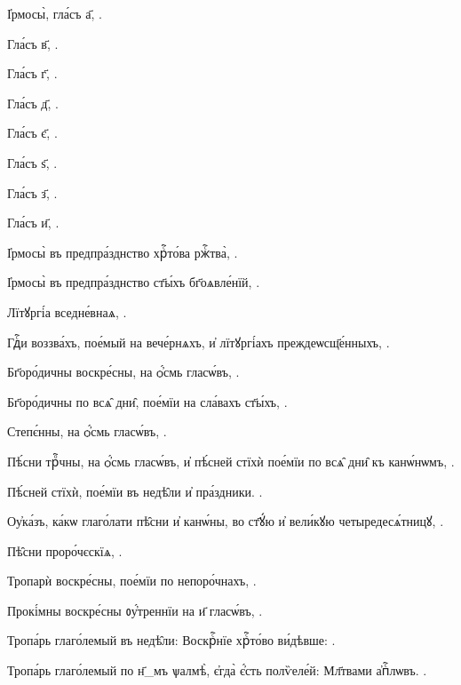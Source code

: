 \cleartorecto

\pagestyle{hirmologion-simplehead}


%
\thispagestyle{hirmologion-simplehead}

І҆рмосы̀, гла́съ а҃, .

Гла́съ в҃, .

Гла́съ г҃, . 

Гла́съ д҃, .

Гла́съ є҃, .

Гла́съ ѕ҃, . 

Гла́съ з҃, .

Гла́съ и҃, .

І҆рмосы̀ въ предпра́зднство хрⷭ҇то́ва ржⷭ҇тва̀, . 

І҆рмосы̀ въ предпра́зднство ст҃ы́хъ бг҃оѧвле́нїй, . 

Лїтꙋргі́а вседне́внаѧ, . 

Гдⷭ҇и воззва́хъ, пое́мый на вече́рнѧхъ, и҆ лїтꙋргі́ахъ  преждеѡсщ҃е́нныхъ, . 

Бг҃оро́дичны воскре́сны, на ѻ҆́смь гласѡ́въ, . 

Бг҃оро́дичны по всѧ̑ дни̑, пое́мїи на сла́вахъ ст҃ы́хъ, . 

Степє́нны, на ѻ҆́смь гласѡ́въ, .

Пѣ́сни трⷪ҇чны, на ѻ҆́смь гласѡ́въ, и҆ пѣ́сней стїхѝ пое́мїи  по всѧ̑ дни̑ къ канѡ́нѡмъ, .

Пѣ́сней стїхѝ, пое́мїи въ недѣ̑ли и҆ пра́здники. .

Оу҆ка́зъ, ка́кѡ глаго́лати пѣ̑сни и҆ канѡ́ны, во ст҃ꙋ́ю и҆  вели́кꙋю четыредесѧ́тницꙋ, . 

Пѣ̑сни проро́чєскїѧ, .

Тропарѝ воскре́сны, пое́мїи по непоро́чнахъ, . 

Прокі́мны воскре́сны ᲂу҆́треннїи на и҃ гласѡ́въ, .

Тропа́рь глаго́лемый въ недѣ̑ли: Воскрⷭ҇нїе хрⷭ҇то́во  ви́дѣвше: . 

Тропа́рь глаго́лемый по н҃_мъ ѱалмѣ̀, є҆гда̀ є҆́сть  полѷеле́й: Мл҃твами а҆пⷭ҇лѡвъ. . 

